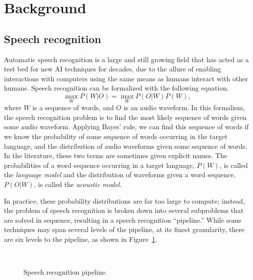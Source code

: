\documentclass{article}
\begin{document}
\section{Background}
\label{sec:background}

\subsection{Speech recognition}
\label{subsec:recognition}

Automatic speech recognition
is a large and still growing field
that has acted as a test bed
for new AI techniques for decades,
due to the allure of enabling
interactions with computers
using the same means
as humans interact with other humans.
Speech recognition can be formalized
with the following equation.
\begin{equation}
  \max_W P(W|O) = \max_W P(O|W) P(W),
\end{equation}
where $W$ is a sequence of words,
and $O$ is an audio waveform.
In this formalism, the speech recognition problem
is to find the most likely sequence of words
given some audio waveform.
Applying Bayes' rule, we can find
this sequence of words
if we know the probability
of some sequence of words occurring
in the target language,
and the distribution of audio waveforms
given some sequence of words.
In the literature, these two terms
are sometimes given explicit names.
The probabilities of a word sequence
occurring in a target language,
$P(W)$, is called the \textit{language model}
and the distribution of waveforms
given a word sequence, $P(O|W)$,
is called the \textit{acoustic model}.

In practice, these probability distributions
are far too large to compute;
instead, the problem of speech recognition
is broken down into several subproblems
that are solved in sequence,
resulting in a speech recognition ``pipeline.''
While some techniques may span several levels
of the pipeline, at its finest granularity,
there are six levels to the pipeline,
as shown in Figure~\ref{fig:recognition}.

\begin{figure}
  \begin{center}
    ~
  \end{center}
  \caption{Speech recognition pipeline.}
  \label{fig:recognition}
\end{figure}
\end{document}
